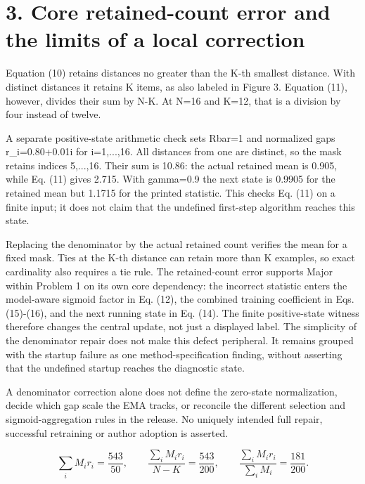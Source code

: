 \documentclass[10pt]{article}
\begin{document}
\section*{3. Core retained-count error and the limits of a local correction}
Equation (10) retains distances no greater than the K-th smallest distance. With distinct distances it retains K items, as also labeled in Figure 3. Equation (11), however, divides their sum by N-K. At N=16 and K=12, that is a division by four instead of twelve.\par
A separate positive-state arithmetic check sets Rbar=1 and normalized gaps r\_i=0.80+0.01i for i=1,...,16. All distances from one are distinct, so the mask retains indices 5,...,16. Their sum is 10.86: the actual retained mean is 0.905, while Eq. (11) gives 2.715. With gamma=0.9 the next state is 0.9905 for the retained mean but 1.1715 for the printed statistic. This checks Eq. (11) on a finite input; it does not claim that the undefined first-step algorithm reaches this state.\par
Replacing the denominator by the actual retained count verifies the mean for a fixed mask. Ties at the K-th distance can retain more than K examples, so exact cardinality also requires a tie rule. The retained-count error supports Major within Problem 1 on its own core dependency: the incorrect statistic enters the model-aware sigmoid factor in Eq. (12), the combined training coefficient in Eqs. (15)-(16), and the next running state in Eq. (14). The finite positive-state witness therefore changes the central update, not just a displayed label. The simplicity of the denominator repair does not make this defect peripheral. It remains grouped with the startup failure as one method-specification finding, without asserting that the undefined startup reaches the diagnostic state.\par
A denominator correction alone does not define the zero-state normalization, decide which gap scale the EMA tracks, or reconcile the different selection and sigmoid-aggregation rules in the release. No uniquely intended full repair, successful retraining or author adoption is asserted.\par
\[\sum_i M_i r_i=\frac{543}{50},\qquad \frac{\sum_i M_i r_i}{N-K}=\frac{543}{200},\qquad \frac{\sum_i M_i r_i}{\sum_i M_i}=\frac{181}{200}.\]\par
\end{document}
